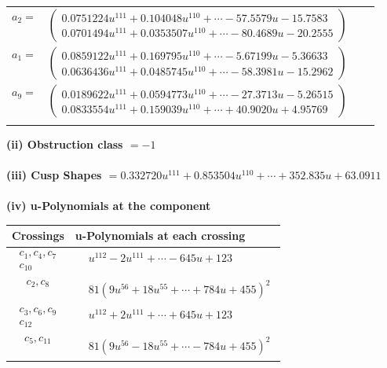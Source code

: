\documentclass[1p]{elsarticle_modified}
\theoremstyle{definition}
\begin{document}
\begin{tabular}{m{7pt} m{180pt} m{7pt} m{180pt} }
\flushright $a_{2}=$&$\begin{pmatrix}0.0751224 u^{111}+0.104048 u^{110}+\cdots-57.5579 u-15.7583\\0.0701494 u^{111}+0.0353507 u^{110}+\cdots-80.4689 u-20.2555\end{pmatrix}$ \\
\flushright $a_{1}=$&$\begin{pmatrix}0.0859122 u^{111}+0.169795 u^{110}+\cdots-5.67199 u-5.36633\\0.0636436 u^{111}+0.0485745 u^{110}+\cdots-58.3981 u-15.2962\end{pmatrix}$ \\
\flushright $a_{9}=$&$\begin{pmatrix}0.0189622 u^{111}+0.0594773 u^{110}+\cdots-27.3713 u-5.26515\\0.0833554 u^{111}+0.159039 u^{110}+\cdots+40.9020 u+4.95769\end{pmatrix}$\\&\end{tabular}
\flushleft \textbf{(ii) Obstruction class $= -1$}\\~\\
\flushleft \textbf{(iii) Cusp Shapes $= 0.332720 u^{111}+0.853504 u^{110}+\cdots+352.835 u+63.0911$}\\~\\
\newpage\renewcommand{\arraystretch}{1}
\flushleft \textbf{(iv) u-Polynomials at the component}\newline \\
\begin{tabular}{m{50pt}|m{274pt}}
Crossings & \hspace{64pt}u-Polynomials at each crossing \\
\hline $$\begin{aligned}c_{1},c_{4},c_{7}\\c_{10}\end{aligned}$$&$\begin{aligned}
&u^{112}-2 u^{111}+\cdots-645 u+123
\end{aligned}$\\
\hline $$\begin{aligned}c_{2},c_{8}\end{aligned}$$&$\begin{aligned}
&81(9 u^{56}+18 u^{55}+\cdots+784 u+455)^{2}
\end{aligned}$\\
\hline $$\begin{aligned}c_{3},c_{6},c_{9}\\c_{12}\end{aligned}$$&$\begin{aligned}
&u^{112}+2 u^{111}+\cdots+645 u+123
\end{aligned}$\\
\hline $$\begin{aligned}c_{5},c_{11}\end{aligned}$$&$\begin{aligned}
&81(9 u^{56}-18 u^{55}+\cdots-784 u+455)^{2}
\end{aligned}$\\
\hline
\end{tabular}\\~\\
\end{document}
